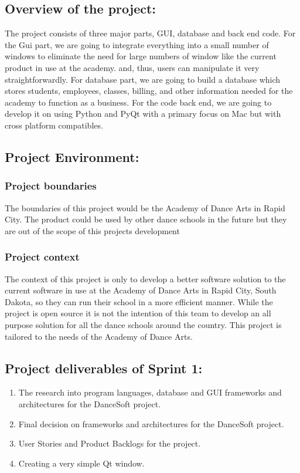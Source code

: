 \subsection{Overview of the project:}
The project consists of three major parts, GUI, database and back end code. For the Gui part, we are going to integrate everything into a small number of windows to eliminate the need for large numbers of window like the current product in use at the academy. and, thus, users can manipulate it very straightforwardly. For database part, we are going to build a database which stores students, employees, classes, billing, and other information needed for the academy to function as a business. For the code back end, we are going to develop it on using Python and PyQt with a primary focus on Mac but with cross platform compatibles. 

\subsection{Project Environment:}

\subsubsection{Project boundaries}
The boundaries of this project would be the Academy of Dance Arts in Rapid City. The product could be used by other dance schools in the future but they are out of the scope of this projects development 

\subsubsection{Project context}
The context of this project is only to develop a better software solution to the current software in use at the Academy of Dance Arts in Rapid City, South Dakota, so they can run their school in a more efficient manner. While the project is open source it is not the intention of this team to develop an all purpose solution for all the dance schools around the country. This project is tailored to the needs of the Academy of Dance Arts.


\subsection{Project deliverables of Sprint 1:}

\begin{enumerate}
\item The research into program languages, database and GUI frameworks and architectures for the DanceSoft project.
\item Final decision on frameworks and architectures for the DanceSoft project.
\item User Stories and Product Backlogs for the project.
\item Creating a very simple Qt window.
\end{enumerate}


